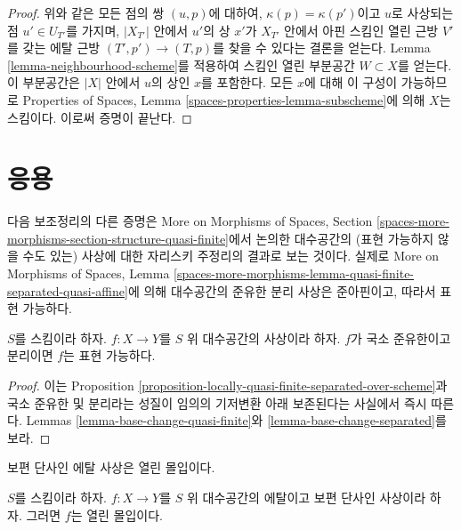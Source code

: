 \begin{proof}
\medskip\noindent
위와 같은 모든 점의 쌍 $(u, p)$에 대하여, $\kappa(p) = \kappa(p')$이고
$u$로 사상되는 점 $u' \in U_{T'}$를 가지며, $|X_{T'}|$ 안에서 $u'$의 상
$x'$가 $X_{T'}$ 안에서 아핀 스킴인 열린 근방 $V'$를 갖는 에탈 근방
$(T', p') \to (T, p)$를 찾을 수 있다는 결론을 얻는다. Lemma
\ref{lemma-neighbourhood-scheme}를 적용하여 스킴인 열린 부분공간
$W \subset X$를 얻는다. 이 부분공간은 $|X|$ 안에서 $u$의 상인 $x$를
포함한다. 모든 $x$에 대해 이 구성이 가능하므로
Properties of Spaces, Lemma \ref{spaces-properties-lemma-subscheme}에 의해
$X$는 스킴이다. 이로써 증명이 끝난다.
\end{proof}

\section{응용}
\label{section-applications}

\noindent
다음 보조정리의 다른 증명은 More on Morphisms of Spaces, Section
\ref{spaces-more-morphisms-section-structure-quasi-finite}에서 논의한
대수공간의 (표현 가능하지 않을 수도 있는) 사상에 대한 자리스키
주정리의 결과로 보는 것이다. 실제로 More on Morphisms of Spaces,
Lemma \ref{spaces-more-morphisms-lemma-quasi-finite-separated-quasi-affine}에
의해 대수공간의 준유한 분리 사상은 준아핀이고, 따라서 표현 가능하다.

\begin{lemma}
\label{lemma-locally-quasi-finite-separated-representable}
$S$를 스킴이라 하자. $f : X \to Y$를 $S$ 위 대수공간의 사상이라 하자.
$f$가 국소 준유한이고 분리이면 $f$는 표현 가능하다.
\end{lemma}

\begin{proof}
이는 Proposition
\ref{proposition-locally-quasi-finite-separated-over-scheme}과 국소
준유한 및 분리라는 성질이 임의의 기저변환 아래 보존된다는 사실에서
즉시 따른다. Lemmas \ref{lemma-base-change-quasi-finite}와
\ref{lemma-base-change-separated}를 보라.
\end{proof}

\begin{lemma}
\label{lemma-etale-universally-injective-open}
\begin{slogan}
보편 단사인 에탈 사상은 열린 몰입이다.
\end{slogan}
$S$를 스킴이라 하자. $f : X \to Y$를 $S$ 위 대수공간의 에탈이고 보편
단사인 사상이라 하자. 그러면 $f$는 열린 몰입이다.
\end{lemma}

